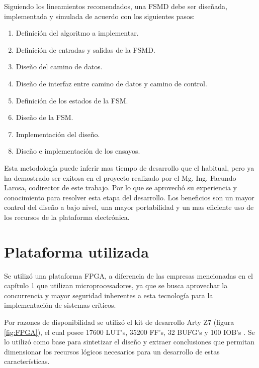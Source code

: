	
	Siguiendo los lineamientos recomendados, una FSMD debe ser diseñada, implementada y simulada de acuerdo con los siguientes pasos:
	
	\begin{enumerate}
		\item Definición del algoritmo a implementar.
		\item Definición de entradas y salidas de la FSMD.
		\item Diseño del camino de datos.
		\item Diseño de interfaz entre camino de datos y camino de control.
		\item Definición de los estados de la FSM.
		\item Diseño de la FSM.
		\item Implementación del diseño.
		\item Diseño e implementación de los ensayos.
	\end{enumerate}
	
	Esta metodología puede inferir mas tiempo de desarrollo que el habitual, pero ya ha demostrado ser exitosa en el proyecto realizado por el Mg. Ing. Facundo Larosa, codirector de este trabajo. Por lo que se aprovechó su experiencia y conocimiento para resolver esta etapa del desarrollo. Los beneficios son un mayor control del diseño a bajo nivel, una mayor portabilidad y un mas eficiente uso de los recursos de la plataforma electrónica.


\section{Plataforma utilizada}

	Se utilizó una plataforma FPGA, a diferencia de las empresas mencionadas en el capítulo 1 que utilizan microprocesadores, ya que se busca aprovechar la concurrencia y mayor seguridad inherentes a esta tecnología\cite{cite23,cite24,cite25} para la implementación de sistemas
críticos.

	Por razones de disponibilidad se utilizó el kit de desarrollo Arty Z7  (figura \ref{fig:FPGA}), el cual posee 17600 LUT’s, 35200 FF’s, 32 BUFG’s y 100 IOB’s \cite{cite28}. Se lo utilizó como base para sintetizar el diseño y extraer conclusiones que permitan dimensionar los recursos lógicos necesarios para un desarrollo de estas características.
	
